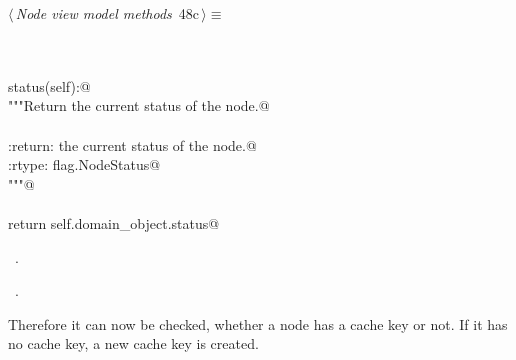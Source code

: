 \documentclass[
    a4paper,      %
    10pt,         %
    openright,    %
    notitlepage,  %
    parskip=half, %
]{scrreprt}       %
\theoremstyle{definition}                    %
\begin{document}
\begin{flushleft} \small
\begin{minipage}{\linewidth}\label{scrap68}\raggedright\small
{} $\langle\,${\itshape Node view model methods}\nobreak\ {\footnotesize {48c}}$\,\rangle\equiv$
\vspace{-1exm}
\begin{list}{}{} \item
\mbox{}\lstinline@@\\
\mbox{}\lstinline@property@\\
\mbox{}\lstinline@def status(self):@\\
\mbox{}\lstinline@    """Return the current status of the node.@\\
\mbox{}\lstinline@@\\
\mbox{}\lstinline@    :return: the current status of the node.@\\
\mbox{}\lstinline@    :rtype: flag.NodeStatus@\\
\mbox{}\lstinline@    """@\\
\mbox{}\lstinline@@\\
\mbox{}\lstinline@    return self.domain_object.status@\\
\mbox{}\lstinline@@{\NWsep}
\end{list}
\vspace{-1.5ex}
\footnotesize
\begin{list}{}{\setlength{\itemsep}{-\parsep}\setlength{\itemindent}{-\leftmargin}}
\item \NWtxtMacroDefBy\ .
\item \NWtxtMacroRefIn\ .

\item{}
\end{list}
\end{minipage}\vspace{4ex}
\end{flushleft}
Therefore it can now be checked, whether a node has a cache key or not. If it
has no cache key, a new cache key is created.
\end{document}
